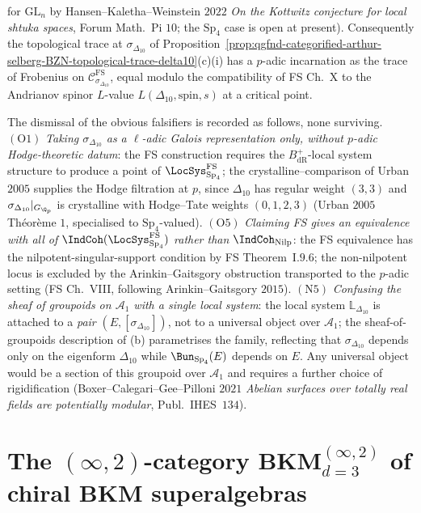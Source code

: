 \begin{conjecture}
\begin{enumerate}
 for $\mathrm{GL}_n$ by Hansen--Kaletha--Weinstein $2022$
 \emph{On the Kottwitz conjecture for local shtuka spaces},
 Forum Math.\ Pi $10$; the $\mathrm{Sp}_4$ case is open at present).
 Consequently the topological trace at $\sigma_{\Delta_{10}}$ of
 Proposition~\ref{prop:qgfnd-categorified-arthur-selberg-BZN-topological-trace-delta10}(c)(i)
 has a $p$-adic incarnation as the trace of Frobenius on
 $\mathcal C_{\sigma_{\Delta_{10}}}^{\mathrm{FS}}$, equal modulo
 the compatibility of FS Ch.~X to the Andrianov spinor $L$-value
 $L(\Delta_{10},\mathrm{spin},s)$ at a critical point.
\end{enumerate}

The dismissal of the obvious falsifiers is recorded as follows, none
surviving. $(\mathrm{O1})$ \emph{Taking $\sigma_{\Delta_{10}}$ as a
$\ell$-adic Galois representation only, without $p$-adic Hodge-theoretic
datum}: the FS construction requires the $B_{\mathrm{dR}}^+$-local
system structure to produce a point of $\LocSys_{\mathrm{Sp}_4}^{\mathrm{FS}}$;
the crystalline--comparison of Urban $2005$ supplies the Hodge filtration at
$p$, since $\Delta_{10}$ has regular weight $(3,3)$ and
$\sigma_{\Delta_{10}}|_{G_{\Q_p}}$ is crystalline with Hodge--Tate
weights $(0,1,2,3)$ (Urban $2005$ Th\'eor\`eme $1$, specialised to
$\mathrm{Sp}_4$-valued). $(\mathrm{O5})$ \emph{Claiming FS gives an
equivalence with all of $\IndCoh(\LocSys_{\mathrm{Sp}_4}^{\mathrm{FS}})$
rather than $\IndCoh_{\mathrm{Nilp}}$}: the FS equivalence has the
nilpotent-singular-support condition by FS Theorem~I.$9.6$; the
non-nilpotent locus is excluded by the Arinkin--Gaitsgory obstruction
transported to the $p$-adic setting (FS Ch.~VIII, following
Arinkin--Gaitsgory $2015$). $(\mathrm{N5})$ \emph{Confusing the sheaf
of groupoids on $\mathcal A_1$ with a single local system}: the local
system $\mathbb L_{\Delta_{10}}$ is attached to a \emph{pair}
$(E,[\sigma_{\Delta_{10}}])$, not to a universal object over $\mathcal A_1$;
the sheaf-of-groupoids description of (b) parametrises the family,
reflecting that $\sigma_{\Delta_{10}}$ depends only on the eigenform
$\Delta_{10}$ while $\Bun_{\mathrm{Sp}_4}(E)$ depends on $E$. Any
universal object would be a section of this groupoid over $\mathcal A_1$
and requires a further choice of rigidification (Boxer--Calegari--Gee--Pilloni
$2021$ \emph{Abelian surfaces over totally real fields are potentially
modular}, Publ.\ IHES~$134$).
\end{conjecture}

\section{The \texorpdfstring{$(\infty,2)$}{(inf,2)}-category \texorpdfstring{$\mathbf{BKM}^{(\infty,2)}_{d=3}$}{BKM-(inf,2)-d=3}
 of chiral BKM superalgebras}
\label{sec:qgf-infty2-bkm-d3}

